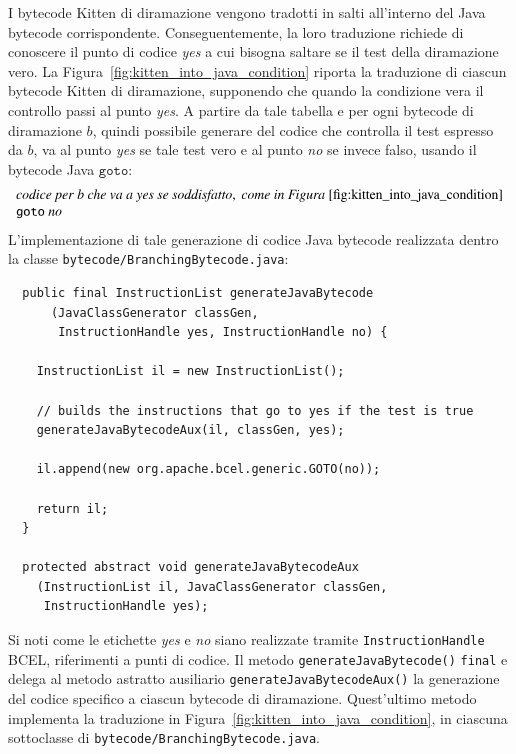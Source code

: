 I bytecode Kitten di diramazione vengono tradotti in salti all'interno del Java bytecode
corrispondente. Conseguentemente, la loro traduzione richiede di conoscere il punto
di codice \textit{yes} a cui bisogna saltare se il test della diramazione \e vero.
La Figura~\ref{fig:kitten_into_java_condition} riporta la traduzione di ciascun
bytecode Kitten di diramazione, supponendo che quando la condizione \e vera il controllo
passi al punto \textit{yes}. A partire da tale tabella e per ogni bytecode di diramazione
$b$, \e quindi possibile generare del codice che controlla il test espresso da $b$,
va al punto \textit{yes} se tale test \e vero e al punto \textit{no} se invece \e falso,
usando il bytecode Java $\mathtt{goto}$:
%
\[\begin{array}{l}
  \mathit{codice\ per\ b\ che\ va\ a\ yes\ se\ soddisfatto,\ come\ in\ Figura~\ref{fig:kitten_into_java_condition}} \\
  \mathtt{goto}\ \mathit{no}
\end{array}\]
%
L'implementazione di tale generazione di codice Java bytecode \e realizzata
dentro la classe \texttt{bytecode/BranchingBytecode.java}:
%
\begin{verbatim}
  public final InstructionList generateJavaBytecode
      (JavaClassGenerator classGen,
       InstructionHandle yes, InstructionHandle no) {

    InstructionList il = new InstructionList();

    // builds the instructions that go to yes if the test is true
    generateJavaBytecodeAux(il, classGen, yes);

    il.append(new org.apache.bcel.generic.GOTO(no));
    
    return il;
  }

  protected abstract void generateJavaBytecodeAux
    (InstructionList il, JavaClassGenerator classGen,
     InstructionHandle yes);
\end{verbatim}
%
Si noti come le etichette \textit{yes} e \textit{no} siano realizzate tramite
\texttt{InstructionHandle} BCEL, \cioe riferimenti a punti di codice. Il metodo
\texttt{generateJavaBytecode()} \e \texttt{final} e delega al metodo astratto ausiliario
\texttt{generateJavaBytecodeAux()}
la generazione del codice specifico a ciascun bytecode di diramazione. Quest'ultimo
metodo implementa la traduzione in Figura~\ref{fig:kitten_into_java_condition},
in ciascuna sottoclasse di \texttt{bytecode/BranchingBytecode.java}.

